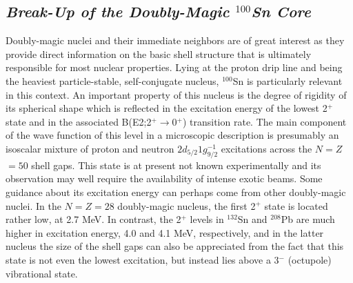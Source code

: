 \documentclass[twoside,12pt]{article}
\begin{document}
\subsection{\it Break-Up of the Doubly-Magic $^{100}$Sn Core}

Doubly-magic nuclei and their immediate neighbors are of great interest
as they provide direct information on the basic shell structure that is
ultimately responsible for most nuclear properties. Lying at the proton
drip line and being
the heaviest particle-stable, self-conjugate nucleus, 
$^{100}$Sn is particularly relevant in this context.
An important property of this nucleus is the degree of rigidity of its 
spherical shape which is reflected in the excitation energy 
of the lowest 2$^+$ state and in the associated B(E2;2$^+\rightarrow$0$^+$)
transition rate. 
The main component of the wave function of 
this level in a microscopic description is presumably
an isoscalar mixture of proton and 
neutron $2d_{5/2} 1g_{9/2}^{-1}$ excitations across the $N$$=$$Z$$=$$50$ shell 
gaps. This state is at present 
not known experimentally and its observation may well require 
the availability of intense exotic beams. 
Some guidance about its excitation energy can perhaps come from other
doubly-magic nuclei. In the $N$$=$$Z=$$28$ doubly-magic nucleus,
the first 2$^+$ state is located rather low, at 2.7 MeV. In contrast,
the 2$^+$ levels in $^{132}$Sn and $^{208}$Pb are much higher in 
excitation energy, 4.0 and 4.1 MeV, respectively, and in the 
latter nucleus the size of the shell gaps can also be appreciated from
the fact that this state is not even the lowest excitation, but instead
lies above a 3$^-$ (octupole) vibrational state.
\end{document}
